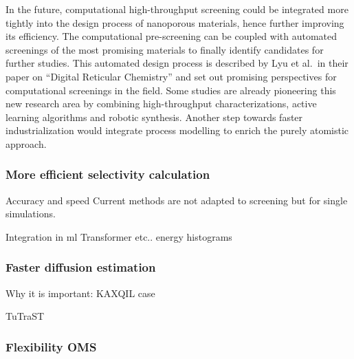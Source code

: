 \documentclass[main.tex]{subfiles}
\begin{document}
In the future, computational high-throughput screening could be integrated more tightly into the design process of nanoporous materials, hence further improving its efficiency. The computational pre-screening can be coupled with automated screenings of the most promising materials to finally identify candidates for further studies. This automated design process is described by Lyu et al.\ in their paper on ``Digital Reticular Chemistry'' and set out promising perspectives for computational screenings in the field.\cite{Lyu_2020} Some studies are already pioneering this new research area by combining high-throughput characterizations, active learning algorithms and robotic synthesis.\cite{Greenaway_2018,Moosavi_2019} Another step towards faster industrialization would integrate process modelling to enrich the purely atomistic approach.

\subsubsection{More efficient selectivity calculation}

Accuracy and speed
Current methods are not adapted to screening but for single simulations. 

Integration in ml\cite{Simon_2015}
Transformer etc..\cite{Kang_2023,Cao_2023}
energy histograms\cite{Shi_2023}


\subsubsection{Faster diffusion estimation}

Why it is important: KAXQIL case

TuTraST\cite{Mace_2019}

\subsubsection{Flexibility OMS}

\OnlyInSubfile{\printglobalbibliography}
\end{document}
